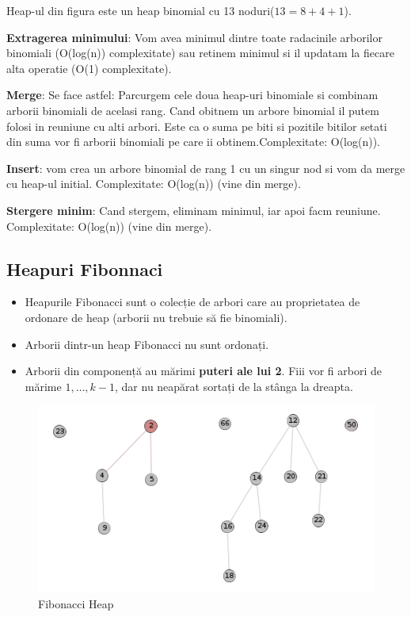 \documentclass[11pt,a4paper]{article}
\theoremstyle{definition}
\theoremstyle{plain}
\theoremstyle{remark}
\begin{document}
Heap-ul din figura este un heap binomial cu 13 noduri($13 = 8 + 4 + 1$).

\textbf{Extragerea minimului}: Vom avea minimul dintre toate radacinile arborilor binomiali (O(log(n)) complexitate) sau retinem minimul si il updatam la fiecare alta operatie (O(1) complexitate).

\textbf{Merge}: Se face astfel: Parcurgem cele doua heap-uri binomiale si combinam arborii binomiali de acelasi rang. Cand obitnem un arbore binomial il putem folosi in reuniune cu alti arbori. Este ca o suma pe biti si pozitile bitilor setati din suma vor fi arborii binomiali pe care ii obtinem.Complexitate: O(log(n)).

\textbf{Insert}: vom crea un arbore binomial de rang 1 cu un singur nod si vom da merge cu heap-ul initial. Complexitate: O(log(n)) (vine din merge).

\textbf{Stergere minim}: Cand stergem, eliminam minimul, iar apoi facm reuniune. Complexitate: O(log(n)) (vine din merge).

\subsection{Heapuri Fibonnaci}

\begin{itemize}
    \item Heapurile Fibonacci sunt o colecție de arbori care au proprietatea de ordonare de heap (arborii nu trebuie să fie binomiali).
    \item Arborii dintr-un heap Fibonacci nu sunt ordonați.
    \item Arborii din componență au mărimi \textbf{puteri ale lui 2}. Fiii vor fi arbori de mărime $1,…, k-1$, dar nu neapărat sortați de la stânga la dreapta.
\end{itemize}

\begin{figure}[H]
    \centering
    \includegraphics[width=0.75\linewidth]{fibonacci-heap.png}
    \caption{Fibonacci Heap}
    \label{fig:enter-label}
\end{figure}
\end{document}

